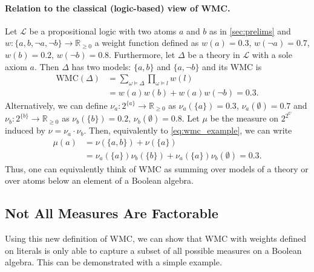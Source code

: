 \documentclass{uai2021} %
\theoremstyle{definition}
\begin{document}
\paragraph{Relation to the classical (logic-based) view of WMC.} Let
$\mathcal{L}$ be a propositional logic with two atoms $a$ and $b$ as in
\cref{sec:prelims} and $w\colon \{ a, b, \neg a, \neg b \} \to \mathbb{R}_{\ge
  0}$ a weight function defined as $w(a) = 0.3$, $w(\neg a) = 0.7$, $w(b)
= 0.2$, $w(\neg b) = 0.8$. Furthermore, let $\Delta$ be a theory in
$\mathcal{L}$ with a sole axiom $a$. Then $\Delta$ has two models: $\{ a, b \}$
and $\{ a, \neg b \}$ and its WMC \citep{DBLP:journals/ai/ChaviraD08} is
\begin{equation} \label{eq:wmc_example}
  \begin{split}
    \mathrm{WMC}(\Delta) &= \sum_{\omega \models \Delta} \prod_{\omega \models l} w(l) \\
    &= w(a)w(b) + w(a)w(\neg b) = 0.3.
  \end{split}
\end{equation}
Alternatively, we can define $\nu_a\colon 2^{\{a\}} \to \mathbb{R}_{\ge 0}$ as
$\nu_a(\{ a \}) = 0.3$, $\nu_a(\emptyset) = 0.7$ and $\nu_b\colon 2^{\{b\}} \to
\mathbb{R}_{\ge 0}$ as $\nu_b(\{ b \}) = 0.2$, $\nu_b(\emptyset) = 0.8$. Let
$\mu$ be the measure on $2^{2^U}$ induced by $\nu = \nu_a \cdot \nu_b$. Then,
equivalently to \cref{eq:wmc_example}, we can write
\begin{align*}
  \mu(a) &= \nu(\{ a, b \}) + \nu(\{ a \}) \\
         &= \nu_a(\{a\})\nu_b(\{b\}) + \nu_a(\{a\})\nu_b(\emptyset) = 0.3.
\end{align*}
Thus, one can equivalently think of WMC as summing over models of a theory or
over atoms below an element of a Boolean algebra.

\subsection{Not All Measures Are Factorable}

Using this new definition of WMC, we can show that WMC with weights defined on
literals is only able to capture a subset of all possible measures on a
Boolean algebra. This can be demonstrated with a simple example.
\end{document}
